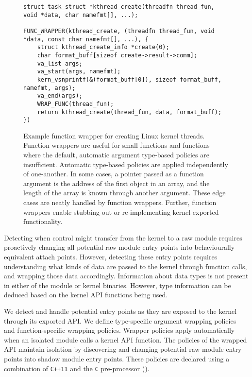 \documentclass[10pt,preprint]{sigplanconf}
\begin{document}
\begin{figure*}
\lstset{language=C, tabsize=2, stepnumber=1}
\begin{lstlisting}[basicstyle=\footnotesize\ttfamily]
struct task_struct *kthread_create(threadfn thread_fun, void *data, char namefmt[], ...);

FUNC_WRAPPER(kthread_create, (threadfn thread_fun, void *data, const char namefmt[], ...), {
    struct kthread_create_info *create(0);
    char format_buff[sizeof create->result->comm];
    va_list args;
    va_start(args, namefmt);
    kern_vsnprintf(&(format_buff[0]), sizeof format_buff, namefmt, args);
    va_end(args);
    WRAP_FUNC(thread_fun);
    return kthread_create(thread_fun, data, format_buff);
})
\end{lstlisting}
\caption{Example function wrapper for creating Linux kernel threads. Function wrappers are useful for small functions and functions where the default, automatic argument type-based policies are insufficient. Automatic type-based policies are applied independently of one-another. In some cases, a pointer passed as a function argument is the address of the first object in an array, and the length of the array is known through another argument. These edge cases are neatly handled by function wrappers. Further, function wrappers enable stubbing-out or re-implementing kernel-exported functionality.}
\label{fig:func_wrapper}
\end{figure*}

Detecting when control might transfer from the kernel to a raw module requires proactively changing all potential raw module entry points into behaviourally equivalent {\sysname} attach points. However, detecting these entry points requires understanding what kinds of data are passed to the kernel through function calls, and wrapping those data accordingly. Information about data types is not present in either of the module or kernel binaries. However, type information can be deduced based on the kernel API functions being used.

We detect and handle potential entry points as they are exposed to the kernel through its exported API. We define type-specific argument wrapping policies and function-specific wrapping policies. Wrapper policies apply automatically when an isolated module calls a kernel API function. The policies of the wrapped API maintain isolation by discovering and changing potential raw module entry points into shadow module entry points. These policies are declared using a combination of \texttt{C++11} and the \texttt{C} pre-processor ().
\end{document}
